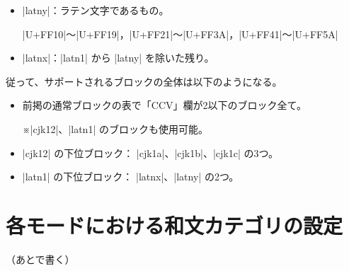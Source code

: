 \documentclass[uplatex,dvipdfmx,a4paper]{jsarticle}
\newcommand{\Note}{\par\noindent ※}
\newcommand{\Means}{：\quad}
\begin{document}
\begin{itemize}
\item |latny|\Means ラテン文字であるもの。\par
  |U+FF10|～|U+FF19|，|U+FF21|～|U+FF3A|，|U+FF41|～|U+FF5A|
\item |latnx|\Means |latn1| から |latny| を除いた残り。
\end{itemize}

従って、サポートされるブロックの全体は以下のようになる。

\begin{itemize}
\item 前掲の通常ブロックの表で「CCV」欄が2以下のブロック全て。
  \Note |cjk12|、|latn1| のブロックも使用可能。
\item |cjk12| の下位ブロック\Means
  |cjk1a|、|cjk1b|、|cjk1c| の3つ。
\item |latn1| の下位ブロック\Means
  |latnx|、|latny| の2つ。
\end{itemize}

\section{各モードにおける和文カテゴリの設定}
\label{sec:Values}

（あとで書く）
\end{document}
